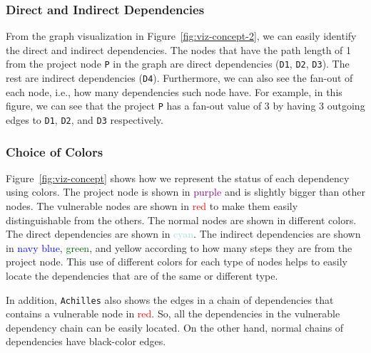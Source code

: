 \documentclass[conference]{IEEEtran}
\begin{document}
	\subsubsection{Direct and Indirect Dependencies}
	From the graph visualization in Figure~\ref{fig:viz-concept-2}, we can easily identify the direct and indirect dependencies. The nodes that have the path length of 1 from the project node \texttt{P} in the graph are direct dependencies (\texttt{D1}, \texttt{D2}, \texttt{D3}). The rest are indirect dependencies (\texttt{D4}). Furthermore, we can also see the fan-out of each node, i.e., how many dependencies such node have.  For example, in this figure, we can see that the project \texttt{P} has a fan-out value of 3 by having 3 outgoing edges to \texttt{D1}, \texttt{D2}, and \texttt{D3} respectively.
	
	
	
	\subsubsection{Choice of Colors}
	Figure~\ref{fig:viz-concept} shows how we represent the status of each dependency using colors. The project node is shown in \textcolor{purple}{purple} and is slightly bigger than other nodes.
	The vulnerable nodes are shown in \textcolor{red}{red} to make them easily distinguishable from the others. The normal nodes are shown in different colors.
	The direct dependencies are shown in \textcolor{lightblue}{cyan}. The indirect dependencies are shown in \textcolor{blue}{navy blue}, \textcolor{darkgreen}{green}, and \textcolor{darkyellow}{yellow} according to how many steps they are from the project node. This use of different colors for each type of nodes helps to easily locate the dependencies that are of the same or different type.
	
	In addition, \texttt{Achilles} also shows the edges in a chain of dependencies that contains a vulnerable node in \textcolor{red}{red}. So, all the dependencies in the vulnerable dependency chain can be easily located. On the other hand, normal chains of dependencies have black-color edges.
	
\end{document}
